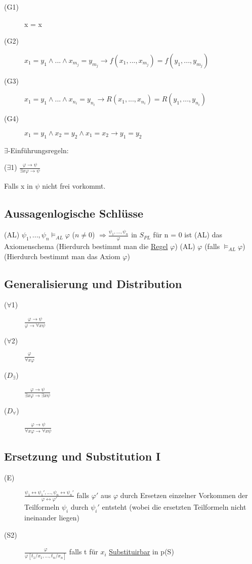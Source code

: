 \documentclass[12pt,a4paper]{article} %
\begin{document}
	\begin{description}
		\item[(G1)] x = x
		\item[(G2)] $x_1 = y_1 \land ... \land x_{m_j} = y_{m_j} \rightarrow f(x_1, ..., x_{m_j}) = f(y_1, ..., y_{m_j})$
		\item[(G3)] $x_1 = y_1 \land ... \land x_{n_i} = y_{n_i} \rightarrow R(x_1, ..., x_{n_i}) = R(y_1, ..., y_{n_i})$
		\item[(G4)] $x_1 = y_1 \land x_2 = y_2 \land x_1 = x_2 \rightarrow y_1 = y_2$
	\end{description} 
	$\exists$-Einführungsregeln:
	
	($\exists$1) $\frac{\varphi \rightarrow \psi}{\exists x \varphi \rightarrow \psi}$ 
	
	Falls x in $\psi$ nicht frei vorkommt. 

	\subsection{Aussagenlogische Schlüsse}
	(AL) $\psi_1, ..., \psi_n \vDash_{AL} \varphi$ ($n \ne 0$) $\Rightarrow \frac{\psi_1, ..., \psi_n}{\varphi}$ in $S_{PL}$ für n = 0 ist (AL) das Axiomenschema (Hierdurch bestimmt man die \hyperref[Kalkul]{Regel} $\varphi$)\newline
	(AL) $\varphi$ (falls $\vDash_{AL} \varphi$) (Hierdurch bestimmt man das Axiom $\varphi$)
	
	\subsection{Generalisierung und Distribution}
	\begin{description}
		\item[($\forall$1)] $\frac{\varphi \rightarrow \psi}{\varphi \rightarrow \forall x \psi}$
		\item[($\forall$2)] $\frac{\varphi}{\forall x \varphi}$
		\item[($D_{\exists}$)] $\frac{\varphi \rightarrow \psi}{\exists x \varphi \rightarrow \exists x \psi}$
		\item[($D_{\forall}$)] $\frac{\varphi \rightarrow \psi}{\forall x \varphi \rightarrow \forall x \psi}$
	\end{description}

	\subsection{Ersetzung und Substitution I}
	\begin{description}
		\item[(E)] $\frac{\psi_1 \leftrightarrow \psi_1', ..., \psi_n \leftrightarrow \psi_n'}{\varphi \leftrightarrow \varphi'}$ falls $\varphi'$ aus $\varphi$ durch Ersetzen einzelner Vorkommen der Teilformeln $\psi_i$ durch $\psi_i'$ entsteht (wobei die ersetzten Teilformeln nicht ineinander liegen)
		\item[(S2)] $\frac{\varphi}{\varphi[t_1/x_1, ..., t_n/x_n]}$ falls t für $x_i$ \hyperref[Substituierbar]{Substituirbar} in p(S)
	\end{description}
\end{document}
